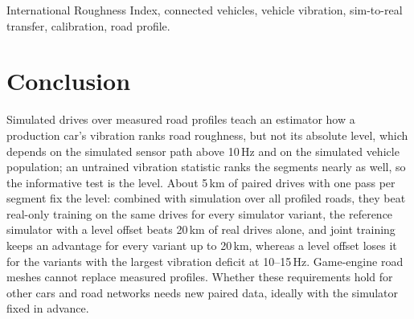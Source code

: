 \documentclass[conference]{IEEEtran}
\begin{document}
\begin{IEEEkeywords}
International Roughness Index, connected vehicles, vehicle vibration, sim-to-real transfer, calibration, road profile.
\end{IEEEkeywords}










\section{Conclusion}
\label{sec:conclusion}
Simulated drives over measured road profiles teach an estimator how a production car's vibration ranks road roughness, but not its absolute level, which depends on the simulated sensor path above 10\,Hz and on the simulated vehicle population; an untrained vibration statistic ranks the segments nearly as well, so the informative test is the level.
About 5\,km of paired drives with one pass per segment fix the level: combined with simulation over all profiled roads, they beat real-only training on the same drives for every simulator variant, the reference simulator with a level offset beats 20\,km of real drives alone, and joint training keeps an advantage for every variant up to 20\,km, whereas a level offset loses it for the variants with the largest vibration deficit at 10--15\,Hz.
Game-engine road meshes cannot replace measured profiles.
Whether these requirements hold for other cars and road networks needs new paired data, ideally with the simulator fixed in advance.


\end{document}
